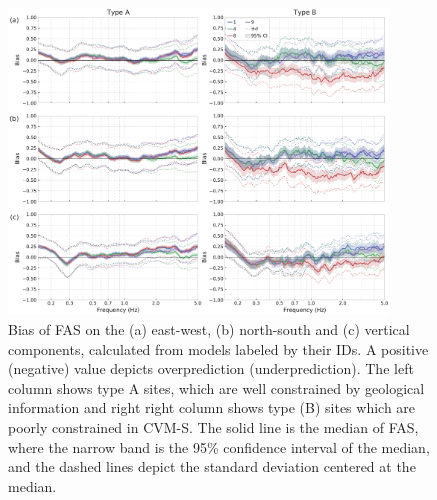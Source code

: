 \begin{figure}[!ht]
  \centering
  \includegraphics[width=0.9\textwidth,height=0.9\textheight,keepaspectratio]{figures/figure_highf_13.pdf}
  \caption{Bias of FAS on the (a) east-west, (b) north-south and (c) vertical components, calculated from models labeled by their IDs. A positive (negative) value depicts overprediction (underprediction). The left column shows type A sites, which are well constrained by geological information and right right column shows type (B) sites which are poorly constrained in CVM-S. The solid line is the median of FAS, where the narrow band is the 95\% confidence interval of the median, and the dashed lines depict the standard deviation centered at the median.
  }
  \label{fig:highf-13}
\end{figure}
\clearpage

